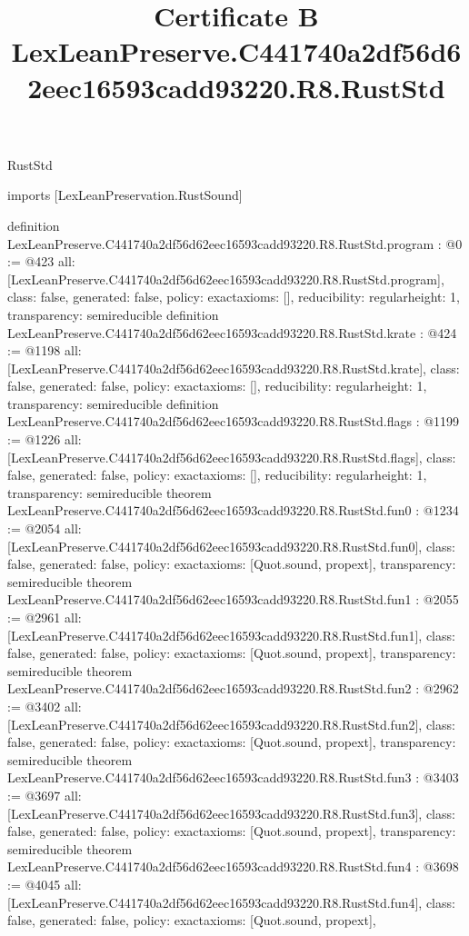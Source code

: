 \begin{lexlean}{RustStd}
\title{Certificate B LexLeanPreserve.C441740a2df56d62eec16593cadd93220.R8.RustStd}
\begin{coremodule}
imports [LexLeanPreservation.RustSound]

definition LexLeanPreserve.C441740a2df56d62eec16593cadd93220.R8.RustStd.program : @0 := @423 {
  all: [LexLeanPreserve.C441740a2df56d62eec16593cadd93220.R8.RustStd.program],
  class: false,
  generated: false,
  policy: exact{axioms: []},
  reducibility: regular{height: 1},
  transparency: semireducible
}
definition LexLeanPreserve.C441740a2df56d62eec16593cadd93220.R8.RustStd.krate : @424 := @1198 {
  all: [LexLeanPreserve.C441740a2df56d62eec16593cadd93220.R8.RustStd.krate],
  class: false,
  generated: false,
  policy: exact{axioms: []},
  reducibility: regular{height: 1},
  transparency: semireducible
}
definition LexLeanPreserve.C441740a2df56d62eec16593cadd93220.R8.RustStd.flags : @1199 := @1226 {
  all: [LexLeanPreserve.C441740a2df56d62eec16593cadd93220.R8.RustStd.flags],
  class: false,
  generated: false,
  policy: exact{axioms: []},
  reducibility: regular{height: 1},
  transparency: semireducible
}
theorem LexLeanPreserve.C441740a2df56d62eec16593cadd93220.R8.RustStd.fun0 : @1234 := @2054 {
  all: [LexLeanPreserve.C441740a2df56d62eec16593cadd93220.R8.RustStd.fun0],
  class: false,
  generated: false,
  policy: exact{axioms: [Quot.sound, propext]},
  transparency: semireducible
}
theorem LexLeanPreserve.C441740a2df56d62eec16593cadd93220.R8.RustStd.fun1 : @2055 := @2961 {
  all: [LexLeanPreserve.C441740a2df56d62eec16593cadd93220.R8.RustStd.fun1],
  class: false,
  generated: false,
  policy: exact{axioms: [Quot.sound, propext]},
  transparency: semireducible
}
theorem LexLeanPreserve.C441740a2df56d62eec16593cadd93220.R8.RustStd.fun2 : @2962 := @3402 {
  all: [LexLeanPreserve.C441740a2df56d62eec16593cadd93220.R8.RustStd.fun2],
  class: false,
  generated: false,
  policy: exact{axioms: [Quot.sound, propext]},
  transparency: semireducible
}
theorem LexLeanPreserve.C441740a2df56d62eec16593cadd93220.R8.RustStd.fun3 : @3403 := @3697 {
  all: [LexLeanPreserve.C441740a2df56d62eec16593cadd93220.R8.RustStd.fun3],
  class: false,
  generated: false,
  policy: exact{axioms: [Quot.sound, propext]},
  transparency: semireducible
}
theorem LexLeanPreserve.C441740a2df56d62eec16593cadd93220.R8.RustStd.fun4 : @3698 := @4045 {
  all: [LexLeanPreserve.C441740a2df56d62eec16593cadd93220.R8.RustStd.fun4],
  class: false,
  generated: false,
  policy: exact{axioms: [Quot.sound, propext]},
}
\end{coremodule}
\end{lexlean}
